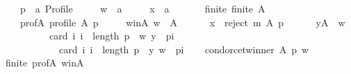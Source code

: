 \begin{isabellebody}
\ \ \ \ p\ {\isacharcolon}{\kern0pt}{\isacharcolon}{\kern0pt}\ {\isachardoublequoteopen}{\isacharprime}{\kern0pt}a\ Profile{\isachardoublequoteclose}\ \isanewline
\ \ \ \ w\ {\isacharcolon}{\kern0pt}{\isacharcolon}{\kern0pt}\ {\isachardoublequoteopen}{\isacharprime}{\kern0pt}a{\isachardoublequoteclose}\ \isanewline
\ \ \ \ x\ {\isacharcolon}{\kern0pt}{\isacharcolon}{\kern0pt}\ {\isachardoublequoteopen}{\isacharprime}{\kern0pt}a{\isachardoublequoteclose}\isanewline
\ \ \isamarkupfalse%
\isanewline
\ \ \ \ finite{\isacharcolon}{\kern0pt}\ {\isachardoublequoteopen}finite\ A{\isachardoublequoteclose}\ \isanewline
\ \ \ \ prof{\isacharunderscore}{\kern0pt}A{\isacharcolon}{\kern0pt}\ {\isachardoublequoteopen}profile\ A\ p{\isachardoublequoteclose}\ \isanewline
\ \ \ \ w{\isacharunderscore}{\kern0pt}in{\isacharunderscore}{\kern0pt}A{\isacharcolon}{\kern0pt}\ {\isachardoublequoteopen}w\ {\isasymin}\ A{\isachardoublequoteclose}\ \isanewline
\ \ \ \ {}{\isacharcolon}{\kern0pt}\ {\isachardoublequoteopen}x\ {\isasymin}\ reject\ m\ A\ p{\isachardoublequoteclose}\ \isanewline
\ \ \ \ {}{\isacharcolon}{\kern0pt}\ {\isachardoublequoteopen}{\isasymforall}y{\isasymin}A\ {\isacharminus}{\kern0pt}\ {\isacharbraceleft}{\kern0pt}w{\isacharbraceright}{\kern0pt}{\isachardot}{\kern0pt}\isanewline
\ \ \ \ \ \ \ \ \ \ card\ {\isacharbraceleft}{\kern0pt}i{\isachardot}{\kern0pt}\ i\ {\isacharless}{\kern0pt}\ length\ p\ {\isasymand}\ {\isacharparenleft}{\kern0pt}w{\isacharcomma}{\kern0pt}\ y{\isacharparenright}{\kern0pt}\ {\isasymin}\ {\isacharparenleft}{\kern0pt}p{\isacharbang}{\kern0pt}i{\isacharparenright}{\kern0pt}{\isacharbraceright}{\kern0pt}\ {\isacharless}{\kern0pt}\isanewline
\ \ \ \ \ \ \ \ \ \ \ \ card\ {\isacharbraceleft}{\kern0pt}i{\isachardot}{\kern0pt}\ i\ {\isacharless}{\kern0pt}\ length\ p\ {\isasymand}\ {\isacharparenleft}{\kern0pt}y{\isacharcomma}{\kern0pt}\ w{\isacharparenright}{\kern0pt}\ {\isasymin}\ {\isacharparenleft}{\kern0pt}p{\isacharbang}{\kern0pt}i{\isacharparenright}{\kern0pt}{\isacharbraceright}{\kern0pt}{\isachardoublequoteclose}\isanewline
\ \ \isamarkupfalse%
\ {\isachardoublequoteopen}condorcet{\isacharunderscore}{\kern0pt}winner\ A\ p\ w{\isachardoublequoteclose}\isanewline
\ \ \ \ \isamarkupfalse%
\ finite\ prof{\isacharunderscore}{\kern0pt}A\ w{\isacharunderscore}{\kern0pt}in{\isacharunderscore}{\kern0pt}A\ {\isachardoublequoteopen}{}{\isachardoublequoteclose}\isanewline

\end{isabellebody}
